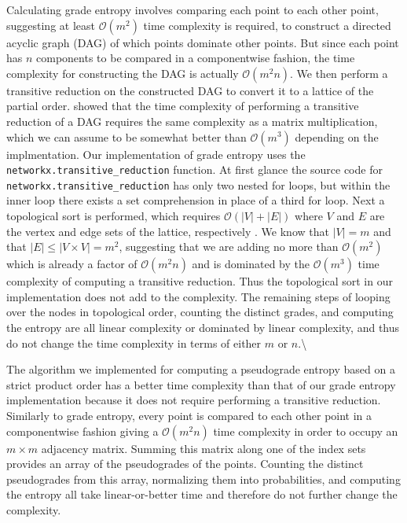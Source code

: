 \documentclass[
  letterpaper,
  DIV=11,
  numbers=noendperiod]{scrreprt}
\begin{document}
Calculating grade entropy involves comparing each point to each other
point, suggesting at least \(\mathcal{O}(m^2)\) time complexity is
required, to construct a directed acyclic graph (DAG) of which points
dominate other points. But since each point has \(n\) components to be
compared in a componentwise fashion, the time complexity for
constructing the DAG is actually \(\mathcal{O}(m^2n)\). We then perform
a transitive reduction on the constructed DAG to convert it to a lattice
of the partial order. \cite{Aho1972} showed that the time complexity of
performing a transitive reduction of a DAG requires the same complexity
as a matrix multiplication, which we can assume to be somewhat better
than \(\mathcal{O}(m^3)\) depending on the implmentation. Our
implementation of grade entropy uses the
\texttt{networkx.transitive\_reduction} function. At first glance the
source code for \texttt{networkx.transitive\_reduction} has only two
nested for loops, but within the inner loop there exists a set
comprehension in place of a third for loop. Next a topological sort is
performed, which requires \(\mathcal{O}(|V| + |E|)\) where \(V\) and
\(E\) are the vertex and edge sets of the lattice, respectively
\cite{Kahn1962}. We know that \(|V| = m\) and that
\(|E| \leq |V \times V| = m^2\), suggesting that we are adding no more
than \(\mathcal{O}(m^2)\) which is already a factor of
\(\mathcal{O}(m^2n)\) and is dominated by the \(\mathcal{O}(m^3)\) time
complexity of computing a transitive reduction. Thus the topological
sort in our implementation does not add to the complexity. The remaining
steps of looping over the nodes in topological order, counting the
distinct grades, and computing the entropy are all linear complexity or
dominated by linear complexity, and thus do not change the time
complexity in terms of either \(m\) or \(n\).\textbackslash{}

The algorithm we implemented for computing a pseudograde entropy based
on a strict product order has a better time complexity than that of our
grade entropy implementation because it does not require performing a
transitive reduction. Similarly to grade entropy, every point is
compared to each other point in a componentwise fashion giving a
\(\mathcal{O}(m^2n)\) time complexity in order to occupy an
\(m \times m\) adjacency matrix. Summing this matrix along one of the
index sets provides an array of the pseudogrades of the points. Counting
the distinct pseudogrades from this array, normalizing them into
probabilities, and computing the entropy all take linear-or-better time
and therefore do not further change the complexity.
\end{document}
